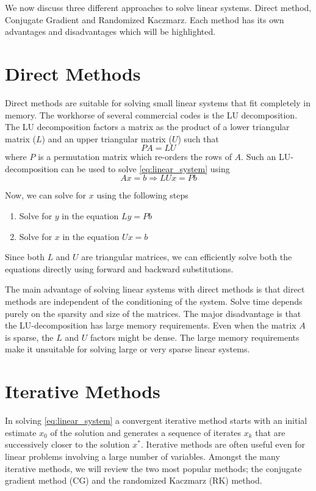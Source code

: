 We now discuss three different approaches to solve linear systems. Direct method,
Conjugate Gradient and Randomized Kaczmarz. Each method has its own advantages
and disadvantages which will be highlighted.

\section{Direct Methods}
Direct methods are suitable for solving small linear systems that fit completely
in memory. The workhorse of several commercial codes is the LU decomposition.
The LU decomposition factors a matrix as the product of a lower triangular matrix
($L$) and an upper triangular matrix ($U$) such that
$$
PA = LU
$$
where $P$ is a permutation matrix which re-orders the rows of $A$. Such an
LU-decomposition can be used to solve \eqref{eq:linear_system} using
$$
  Ax = b \Rightarrow LUx = Pb
$$

Now, we can solve for $x$ using the following steps
\begin{enumerate}
  \item Solve for $y$ in the equation $Ly = Pb$
  \item Solve for $x$ in the equation $Ux = b$
\end{enumerate}
Since both $L$ and $U$ are triangular matrices, we can efficiently solve both
the equations directly using forward and backward substitutions.

The main advantage of solving linear systems with direct methods is that direct
methods are independent of the conditioning of the system. Solve time depends
purely on the sparsity and size of the matrices. The major disadvantage is
that the LU-decomposition has large memory requirements. Even when the matrix
$A$ is sparse, the $L$ and $U$ factors might be dense. The large memory
requirements make it unsuitable for solving large or very sparse linear
systems.

\section{Iterative Methods}
In solving \eqref{eq:linear_system} a convergent iterative method starts
with an initial estimate $x_0$ of the solution and generates a sequence of iterates
$x_k$ that are successively closer to the solution $x^*$. Iterative methods
are often useful even for linear problems involving a large number of variables.
Amongst the many iterative methods, we will review the two most popular methods;
the conjugate gradient method (CG) and the randomized Kaczmarz (RK) method.

